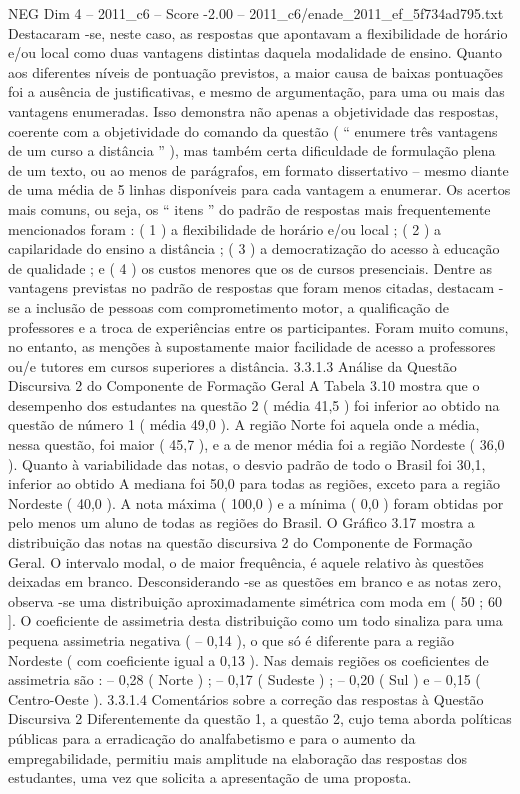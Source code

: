 \begin{textsample}{NEG Dim 4 – 2011\_c6 – Score -2.00 – 2011\_c6/enade\_2011\_ef\_5f734ad795.txt}
Destacaram -se, neste caso, as respostas que apontavam a flexibilidade de horário e/ou local como duas vantagens distintas daquela modalidade de ensino.
Quanto aos diferentes níveis de pontuação previstos, a maior causa de baixas pontuações foi a ausência de justificativas, e mesmo de argumentação, para uma ou mais das vantagens enumeradas.
Isso demonstra não apenas a objetividade das respostas, coerente com a objetividade do comando da questão ( “ enumere três vantagens de um curso a distância ” ), mas também certa dificuldade de formulação plena de um texto, ou ao menos de parágrafos, em formato dissertativo – mesmo diante de uma média de 5 linhas disponíveis para cada vantagem a enumerar.
Os acertos mais comuns, ou seja, os “ itens ” do padrão de respostas mais frequentemente mencionados foram : ( 1 ) a flexibilidade de horário e/ou local ; ( 2 ) a capilaridade do ensino a distância ; ( 3 ) a democratização do acesso à educação de qualidade ; e ( 4 ) os custos menores que os de cursos presenciais.
Dentre as vantagens previstas no padrão de respostas que foram menos citadas, destacam -se a inclusão de pessoas com comprometimento motor, a qualificação de professores e a troca de experiências entre os participantes.
Foram muito comuns, no entanto, as menções à supostamente maior facilidade de acesso a professores ou/e tutores em cursos superiores a distância. 3.3.1.3 Análise da Questão Discursiva 2 do Componente de Formação Geral A Tabela 3.10 mostra que o desempenho dos estudantes na questão 2 ( média 41,5 ) foi inferior ao obtido na questão de número 1 ( média 49,0 ).
A região Norte foi aquela onde a média, nessa questão, foi maior ( 45,7 ), e a de menor média foi a região Nordeste ( 36,0 ).
Quanto à variabilidade das notas, o desvio padrão de todo o Brasil foi 30,1, inferior ao obtido A mediana foi 50,0 para todas as regiões, exceto para a região Nordeste ( 40,0 ).
A nota máxima ( 100,0 ) e a mínima ( 0,0 ) foram obtidas por pelo menos um aluno de todas as regiões do Brasil.
O Gráfico 3.17 mostra a distribuição das notas na questão discursiva 2 do Componente de Formação Geral.
O intervalo modal, o de maior frequência, é aquele relativo às questões deixadas em branco.
Desconsiderando -se as questões em branco e as notas zero, observa -se uma distribuição aproximadamente simétrica com moda em ( 50 ; 60 ].
O coeficiente de assimetria desta distribuição como um todo sinaliza para uma pequena assimetria negativa ( – 0,14 ), o que só é diferente para a região Nordeste ( com coeficiente igual a 0,13 ).
Nas demais regiões os coeficientes de assimetria são : – 0,28 ( Norte ) ; – 0,17 ( Sudeste ) ; – 0,20 ( Sul ) e – 0,15 ( Centro-Oeste ). 3.3.1.4 Comentários sobre a correção das respostas à Questão Discursiva 2 Diferentemente da questão 1, a questão 2, cujo tema aborda políticas públicas para a erradicação do analfabetismo e para o aumento da empregabilidade, permitiu mais amplitude na elaboração das respostas dos estudantes, uma vez que solicita a apresentação de uma proposta.

\end{textsample}
